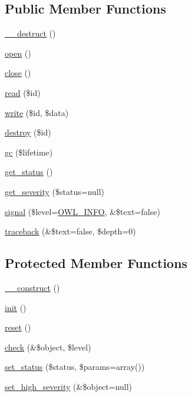 \subsection*{Public Member Functions}
\begin{DoxyCompactItemize}
\item 
\hyperlink{classSessionHandler_a461097c3ee6b1aecf833ce1225d02329}{\_\-\_\-destruct} ()
\item 
\hyperlink{classSessionHandler_a50aa0b123f53d99de350a0eb02b4bfa5}{open} ()
\item 
\hyperlink{classSessionHandler_a335ced83731c7e3e685b7e0df2989c79}{close} ()
\item 
\hyperlink{classSessionHandler_a58cc3e5bf5b14e7bfbc73162de1f5d2b}{read} (\$id)
\item 
\hyperlink{classSessionHandler_ab59071ef0d3deee2472c6916471bd9f5}{write} (\$id, \$data)
\item 
\hyperlink{classSessionHandler_a4e43712ef307979de1b12039ef801adb}{destroy} (\$id)
\item 
\hyperlink{classSessionHandler_ac33097332375ae3f8a43c31cef6db0e8}{gc} (\$lifetime)
\item 
\hyperlink{class__OWL_a99ec771fa2c5c279f80152cc09e489a8}{get\_\-status} ()
\item 
\hyperlink{class__OWL_adf9509ef96858be7bdd9414c5ef129aa}{get\_\-severity} (\$status=null)
\item 
\hyperlink{class__OWL_a51ba4a16409acf2a2f61f286939091a5}{signal} (\$level=\hyperlink{owl_8severitycodes_8php_a139328861128689f2f4def6a399d9057}{OWL\_\-INFO}, \&\$text=false)
\item 
\hyperlink{class__OWL_aa29547995d6741b7d2b90c1d4ea99a13}{traceback} (\&\$text=false, \$depth=0)
\end{DoxyCompactItemize}
\subsection*{Protected Member Functions}
\begin{DoxyCompactItemize}
\item 
\hyperlink{classSessionHandler_a546ba6d31a1ce532de13f65aadc3be0e}{\_\-\_\-construct} ()
\item 
\hyperlink{class__OWL_ae0ef3ded56e8a6b34b6461e5a721cd3e}{init} ()
\item 
\hyperlink{class__OWL_a2f2a042bcf31965194c03033df0edc9b}{reset} ()
\item 
\hyperlink{class__OWL_ad6f4f6946f40199dd0333cf219fa500e}{check} (\&\$object, \$level)
\item 
\hyperlink{class__OWL_aea912d0ede9b3c2a69b79072d94d4787}{set\_\-status} (\$status, \$params=array())
\item 
\hyperlink{class__OWL_a576829692a3b66e3d518853bf43abae3}{set\_\-high\_\-severity} (\&\$object=null)
\end{DoxyCompactItemize}

